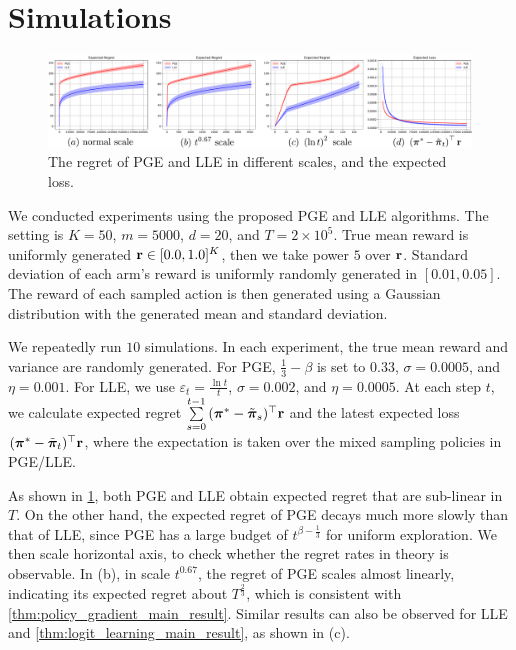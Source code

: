 \section{Simulations}
\label{sec:sumulations}

\begin{figure}[h]
\label{fig:regret_loss_scales}
\centering
\includegraphics[width=1\linewidth]{comparison_PGE_LLE_regret_scales.pdf}
\caption{The regret of PGE and LLE in different scales, and the expected loss.}
\end{figure}

We conducted experiments using the proposed PGE and LLE algorithms. The setting is $K = 50$, $m = 5000$, $d = 20$, and $T = 2 \times 10^5$. True mean reward is uniformly generated ${\mathbf{r}} \in [0.0, 1.0]^K$, then we take power $5$ over ${\mathbf{r}}$. Standard deviation of each arm's reward is uniformly randomly generated in $[0.01, 0.05]$. The reward of each sampled action is then generated using a Gaussian distribution with the generated mean and standard deviation.

We repeatedly run $10$ simulations. In each experiment, the true mean reward and variance are randomly generated. For PGE, $\frac{1}{3} - \beta$ is set to $0.33$, $\sigma = 0.0005$, and $\eta = 0.001$. For LLE, we use $\varepsilon_t = \frac{\ln{t}}{t}$, $\sigma = 0.002$, and $\eta = 0.0005$. At each step $t$, we calculate expected regret $\sum\limits_{s = 0}^{t - 1}{ ( {{\boldsymbol{\pi}}^*}  - \tilde{{\boldsymbol{\pi}}}_s)^\top {\mathbf{r}} } $ and the latest expected loss $( {{\boldsymbol{\pi}}^*}  - \tilde{{\boldsymbol{\pi}}}_t)^\top {\mathbf{r}}$, where the expectation is taken over the mixed sampling policies in PGE/LLE.

As shown in \cref{fig:regret_loss_scales}, both PGE and LLE obtain expected regret that are sub-linear in $T$. On the other hand, the expected regret of PGE decays much more slowly than that of LLE, since PGE has a large budget of $t^{\beta - \frac{1}{3}}$ for uniform exploration. We then scale horizontal axis, to check whether the regret rates in theory is observable. In (b), in scale $t^{0.67}$, the regret of PGE scales almost linearly, indicating its expected regret about $T^{\frac{2}{3}}$, which is consistent with \cref{thm:policy_gradient_main_result}. Similar results can also be observed for LLE and \cref{thm:logit_learning_main_result}, as shown in (c).